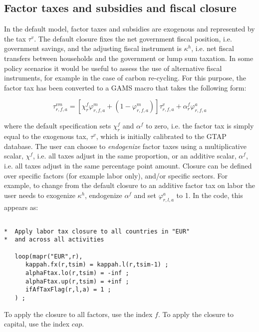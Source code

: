 \documentclass[11pt,letterpaper]{report}
\begin{document}
\subsection{Factor taxes and subsidies and fiscal closure}
\label{sec:ctaxrecycle}

In the default model, factor taxes and subsidies are exogenous
and represented by the tax $\tau^v$. The default closure
fixes the net government fiscal position, i.e. government
savings, and the adjusting fiscal instrument is $\kappa^h$,
i.e. net fiscal transfers between households and the government or lump sum taxation. In some policy scenarios it would be useful
to assess the use of alternative fiscal instruments, for
example in the case of carbon re-cycling. For this
purpose, the factor tax has been converted to a GAMS macro
that takes the following form:

\[
\tau^{\mathit{vm}}_{r,f,a} = \left[\chi^f_r \varphi^m_{r,f,a} + (1 - \varphi^m_{r,f,a})\right] \tau^v_{r,f,a}
+ \alpha^f_r \varphi^a_{r,f,a}
\]

\noindent where the default specification sets $\chi^f_r$ and
$\alpha^f$ to zero, i.e. the factor tax is simply equal
to the exogenous tax, $\tau^v$, which is initially calibrated
to the GTAP database. The user can choose to \emph{endogenize}
factor taxes using a multiplicative scalar, $\chi^f$, i.e.
all taxes adjust in the same proportion, or an additive
scalar, $\alpha^f$, i.e. all taxes adjust in the same
percentage point amount. Closure can be defined over
specific factors (for example labor only), and/or specific
sectors. For example, to change from the default closure to
an additive factor tax on labor the user needs to
exogenize $\kappa^h$, endogenize $\alpha^f$ and
set $\varphi^a_{r,l,a}$ to 1. In the code, this appears as:

\begin{lstlisting}[language=GAMS,
	caption={Labor tax closure}, label=lst:LabClosure]

*  Apply labor tax closure to all countries in "EUR"
*  and across all activities

   loop(mapr("EUR",r),
      kappah.fx(r,tsim) = kappah.l(r,tsim-1) ;
      alphaFtax.lo(r,tsim) = -inf ;
      alphaFtax.up(r,tsim) = +inf ;
      ifAfTaxFlag(r,l,a) = 1 ;
   ) ;

\end{lstlisting}

To apply the closure to all factors, use the index
$f$. To apply the closure to capital, use the
index $\mathit{cap}$.
\end{document}
